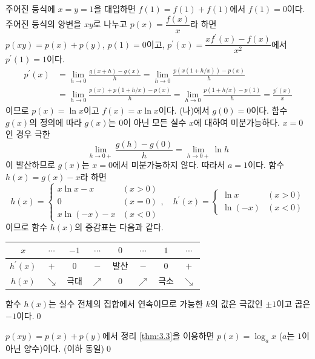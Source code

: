 \documentclass{article}
\begin{document}
\begin{sol}[정석 풀이]
	주어진 등식에 $x=y=1$을 대입하면 $f(1)=f(1)+f(1)$에서 $f(1)=0$이다. 주어진 등식의 양변을 $xy$로 나누고 $p(x)=\dfrac{f(x)}{x}$라 하면 $p(xy)=p(x)+p(y)$, $p(1)=0$이고, $p^\prime(x)=\dfrac{xf^\prime(x)-f(x)}{x^2}$에서 $p^\prime(1)=1$이다.
	\begin{align*}
		p^\prime(x)&=\lim\limits_{h\to 0}\frac{g(x+h)-g(x)}{h}=\lim\limits_{h\to 0}\frac{p(x(1+h/x))-p(x)}{h}\\[3pt]
		&=\lim\limits_{h\to 0}\frac{p(x)+p(1+h/x)-p(x)}{h}=\lim\limits_{h\to 0}\frac{p(1+h/x)-p(1)}{h}=\frac{p^\prime(x)}{x}
	\end{align*}
	이므로 $p(x)=\ln x$이고 $f(x)=x\ln x$이다. (나)에서 $g(0)=0$이다. 함수 $g(x)$의 정의에 따라 $g(x)$는 $0$이 아닌 모든 실수 $x$에 대하여 미분가능하다. $x=0$인 경우 극한
	\[
		\lim\limits_{h\to 0+}\frac{g(h)-g(0)}{h}=\lim\limits_{h\to 0+}\ln h
	\]
	이 발산하므로 $g(x)$는 $x=0$에서 미분가능하지 않다. 따라서 $a=1$이다. 함수 $h(x)=g(x)-x$라 하면
	\[
		h(x)=\begin{cases}
			x\ln x-x & (x>0) \\
			0 & (x=0) \\
			x\ln(-x)-x & (x<0)
		\end{cases},\quad h^\prime(x)=\begin{cases}
			\ln x & (x>0) \\
			\ln(-x) & (x<0)
		\end{cases}
	\]
	이므로 함수 $h(x)$의 증감표는 다음과 같다.
	\begin{table}[H]
		\centering
		\begin{tabular}{c|ccccccc}
			\toprule
			$x$ & $\cdots$ & $-1$ & $\cdots$ & $0$ & $\cdots$ & $1$ & $\cdots$ \\
			\midrule
			$h^\prime(x)$ & $+$ & $0$ & $-$ & 발산 & $-$ & $0$ & $+$ \\
			\midrule
			$h(x)$ & $\searrow$ & 극대 & $\nearrow$ & $0$ & $\nearrow$ & 극소 & $\searrow$ \\
			\bottomrule
		\end{tabular}
	\end{table}
	함수 $h(x)$는 실수 전체의 집합에서 연속이므로 가능한 $k$의 값은 극값인 $\pm1$이고 곱은 $-1$이다.\qed
\end{sol}

\begin{sol}[다른 풀이]
	$p(xy)=p(x)+p(y)$에서 정리 \ref{thm:3.3}을 이용하면 $p(x)=\log_ax$ ($a$는 $1$이 아닌 양수)이다. (이하 동일)\qed
\end{sol}
\end{document}

